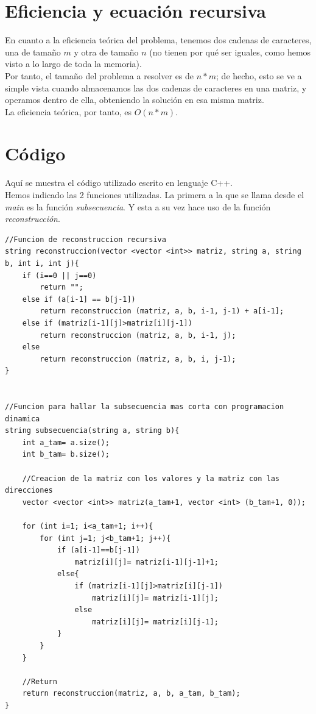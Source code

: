 \documentclass[11pt,a4paper]{article} %
\begin{document}
\newpage
\section{Eficiencia y ecuación recursiva}
En cuanto a la eficiencia teórica del problema, tenemos dos cadenas de caracteres, una de tamaño $m$ y otra de tamaño $n$ (no tienen por qué ser iguales, como hemos visto a lo largo de toda la memoria).\\

Por tanto, el tamaño del problema a resolver es de $n*m$; de hecho, esto se ve a simple vista cuando almacenamos las dos cadenas de caracteres en una matriz, y operamos dentro de ella, obteniendo la solución en esa misma matriz.\\

La eficiencia teórica, por tanto, es $O(n*m)$.



\newpage
\section{Código}
Aquí se muestra el código utilizado escrito en lenguaje C++.\\

Hemos indicado las 2 funciones utilizadas. La primera a la que se llama desde el \textit{main} es la función \textit{subsecuencia}. Y esta a su vez hace uso de la función \textit{reconstrucción}.

\begin{lstlisting}[style=C++]
//Funcion de reconstruccion recursiva
string reconstruccion(vector <vector <int>> matriz, string a, string b, int i, int j){
	if (i==0 || j==0)
		return "";
	else if (a[i-1] == b[j-1])
		return reconstruccion (matriz, a, b, i-1, j-1) + a[i-1];
	else if (matriz[i-1][j]>matriz[i][j-1])
		return reconstruccion (matriz, a, b, i-1, j);
	else
		return reconstruccion (matriz, a, b, i, j-1);
}


//Funcion para hallar la subsecuencia mas corta con programacion dinamica
string subsecuencia(string a, string b){
	int a_tam= a.size();
	int b_tam= b.size();
	
	//Creacion de la matriz con los valores y la matriz con las direcciones
	vector <vector <int>> matriz(a_tam+1, vector <int> (b_tam+1, 0));
	
	for (int i=1; i<a_tam+1; i++){
		for (int j=1; j<b_tam+1; j++){
			if (a[i-1]==b[j-1])
				matriz[i][j]= matriz[i-1][j-1]+1;
			else{
				if (matriz[i-1][j]>matriz[i][j-1])
					matriz[i][j]= matriz[i-1][j];
				else
					matriz[i][j]= matriz[i][j-1];
			}
		}
	}	
	
	//Return
	return reconstruccion(matriz, a, b, a_tam, b_tam);
}
\end{lstlisting}
\end{document}

